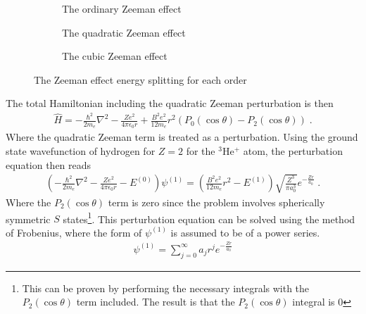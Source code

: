         \begin{figure}[h]
            \centering
            \begin{subfigure}{0.28\linewidth}
                \resizebox{\textwidth}{!}{}
                \caption{The ordinary Zeeman effect}
                \label{fig:a}
            \end{subfigure}
            \hfill
            \begin{subfigure}{0.32\linewidth}
                \resizebox{0.9\textwidth}{!}{}
                \caption{The quadratic Zeeman effect}
                \label{fig:b}
            \end{subfigure}
            \hfill
            \begin{subfigure}{0.28\linewidth}
                \resizebox{\textwidth}{!}{}
                \caption{The cubic Zeeman effect}
                \label{fig:c}
            \end{subfigure}
            \caption{The Zeeman effect energy splitting for each order}
            \label{fig:overall}
        \end{figure}
        \noindent The total Hamiltonian including the quadratic Zeeman perturbation is then 
        \begin{align}
            \hat{H} = - \frac{\hbar^2}{2m_e} \nabla^2 - \frac{Ze^2}{4\pi \epsilon_0 r} + \frac{B^2e^2}{12m_e}r^2 (P_0(\cos \theta) - P_2(\cos \theta))\;. \label{eq:r_sqrd_perturbation}
        \end{align}
        \noindent Where the quadratic Zeeman term is treated as a perturbation. Using the ground state wavefunction of hydrogen for $Z = 2$ for the $^3$He$^+$ atom, the perturbation equation then reads 
        \begin{align}
            \left(- \frac{\hbar^2}{2m_e} \nabla^2 - \frac{Ze^2}{4\pi \epsilon_0 r} - E^{(0)} \right) \psi^{(1)} = \left(\frac{B^2e^2}{12m_e}r^2 - E^{(1)} \right) \sqrt{\frac{Z^3}{\pi a_0^3}} e^{-\frac{Zr}{a_0}}\;.
        \end{align}
        \noindent Where the $P_2(\cos \theta)$ term is zero since the problem involves spherically symmetric $S$ states\footnote{This can be proven by performing the necessary integrals with the $P_2(\cos\theta)$ term included. The result is that the $P_2(\cos \theta)$ integral is 0}. This perturbation equation can be solved using the method of Frobenius, where the form of $\psi^{(1)}$ is assumed to be of a power series.
        \begin{align}
            \psi^{(1)} = \sum_{j = 0}^\infty a_j r^j e^{-\frac{Zr}{a_0}}
        \end{align}
